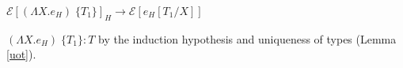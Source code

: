 \begin{case}
$\mathscr{E}[(\Lambda X.e_{H})\;\lbrace T_{1}\rbrace]_{H}\rightarrow\mathscr{E}[e_{H}[T_{1}/X]]$

$(\Lambda X.e_{H})\;\lbrace T_{1}\rbrace:T$ by the induction hypothesis and uniqueness of types (Lemma \ref{uot}).

\end{case}